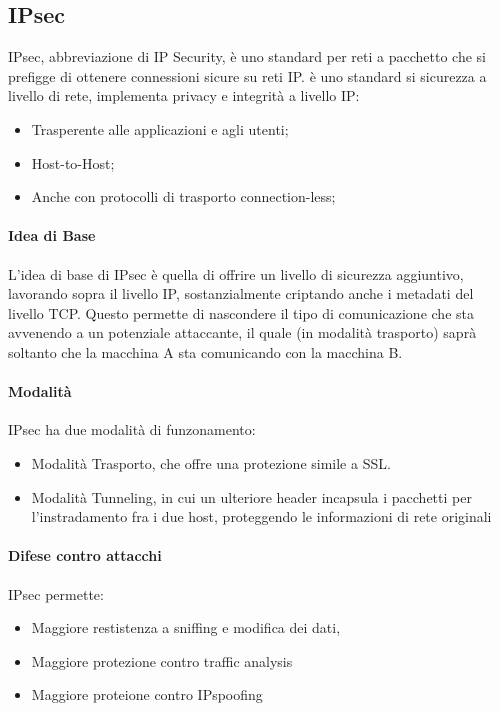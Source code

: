 \documentclass[12pt, a4paper, openany]{book}
\begin{document}
\subsection{IPsec}
IPsec, abbreviazione di IP Security, è uno standard per reti a pacchetto che si prefigge di ottenere connessioni sicure su reti IP.
è uno standard si sicurezza a livello di rete, implementa privacy e integrità a livello IP:
\begin{itemize}
    \item Trasperente alle applicazioni e agli utenti;
    \item Host-to-Host;
    \item Anche con protocolli di trasporto connection-less;
\end{itemize}

\paragraph*{Idea di Base}
L'idea di base di IPsec è quella di offrire un livello di sicurezza aggiuntivo, lavorando sopra il livello IP, sostanzialmente criptando anche i metadati del livello TCP.
Questo permette di nascondere il tipo di comunicazione che sta avvenendo a un potenziale attaccante, il quale (in modalità trasporto) saprà soltanto che la macchina A sta comunicando con la macchina B.

\paragraph*{Modalità}
IPsec ha due modalità di funzonamento:
\begin{itemize}
    \item Modalità Trasporto, che offre una protezione simile a SSL.
    \item Modalità Tunneling, in cui un ulteriore header incapsula i pacchetti per l'instradamento fra i due host, proteggendo le informazioni di rete originali 
\end{itemize}

\paragraph{Difese contro attacchi}
IPsec permette:
\begin{itemize}
    \item Maggiore restistenza a sniffing e modifica dei dati,
    \item Maggiore protezione contro traffic analysis
    \item Maggiore proteione contro IPspoofing
\end{itemize}
\end{document}
